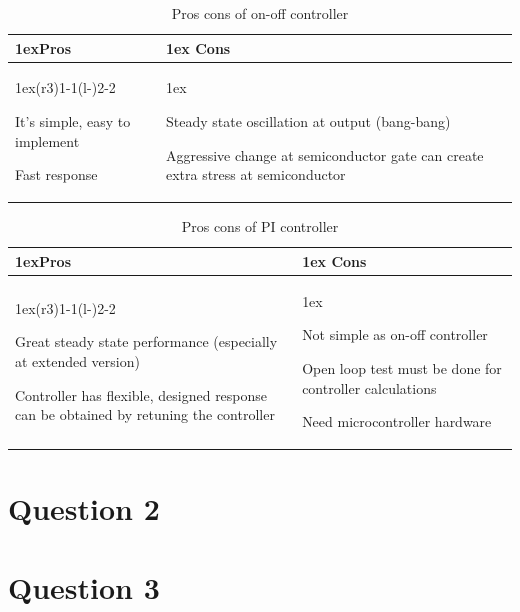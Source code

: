 \documentclass[fleqn, a4paper]{report}
\begin{document}
\begin{table}
\begin{tabularx}{\linewidth}{>{\parskip1ex}X@{\kern4\tabcolsep}>{\parskip1ex}X}
\toprule
\hfil\bfseries Pros
&
\hfil\bfseries Cons
\\\cmidrule(r{3\tabcolsep}){1-1}\cmidrule(l{-\tabcolsep}){2-2}

It's simple, easy to implement\par
Fast response\par

&

Steady state oscillation at output (bang-bang)\par
Aggressive change at semiconductor gate can create extra stress at semiconductor \par


\\\bottomrule
\end{tabularx}
\caption{Pros cons of on-off controller}
\end{table}
\begin{table}
\begin{tabularx}{\linewidth}{>{\parskip1ex}X@{\kern4\tabcolsep}>{\parskip1ex}X}
\toprule
\hfil\bfseries Pros
&
\hfil\bfseries Cons
\\\cmidrule(r{3\tabcolsep}){1-1}\cmidrule(l{-\tabcolsep}){2-2}


Great steady state performance (especially at extended version)\par
Controller has flexible, designed response can be obtained by retuning the controller  \par
&

Not simple as on-off controller\par
Open loop test must be done for controller calculations\par
Need microcontroller hardware


\\\bottomrule
\end{tabularx}
\caption{Pros cons of PI controller}
\end{table}
\section*{Question 2}

\section*{Question 3}
\end{document}
